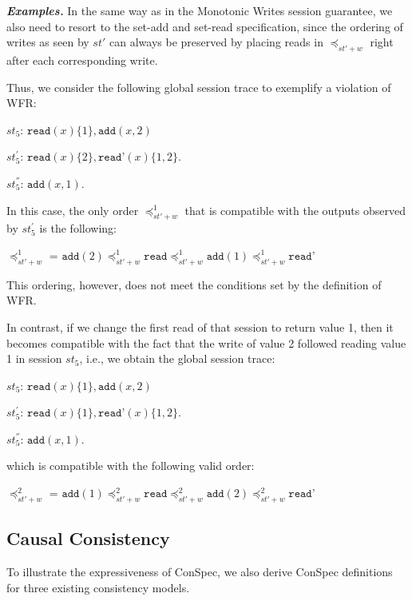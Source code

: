 \documentclass[journal,compsoc]{IEEEtran}
\begin{document}
\noindent \emph{\textbf{Examples.}}
In the same way as in the Monotonic Writes session guarantee, we also need to resort to the set-add and set-read specification, since the ordering of writes as seen by $st'$ can always be preserved by placing reads in $\preccurlyeq_{\mathit{st'}+w}$ right after each corresponding write.

Thus, we consider the following global session trace to exemplify a violation of WFR:


 $\mathit{st}_5$: $\texttt{read}(x){\{1\}},\texttt{add}(x,2)$ 

$\mathit{st}_5^{'}$: $\texttt{read}(x){\{2\}},\texttt{read'}(x){\{1,2\}}$. 

$\mathit{st}_5^{''}$: $\texttt{add}(x,1)$. 

In this case, the only order $\preccurlyeq_{\mathit{st'}+w}^1$ that is compatible with the outputs observed by $\mathit{st}_5^{'}$ is the following:

  \noindent $\preccurlyeq_{\mathit{st'}+w}^1$ = $\texttt{add}(2) \preccurlyeq_{\mathit{st'}+w}^1 \texttt{read}
  \preccurlyeq_{\mathit{st'}+w}^1  \texttt{add}(1) \preccurlyeq_{\mathit{st'}+w}^1 \texttt{read'}$

This ordering, however, does not meet the conditions set by the definition of WFR.

In contrast, if we change the first read of that session to return  value 1, then it becomes compatible with the fact that the write of value 2 followed reading value 1 in session $\mathit{st}_5$, i.e., we obtain the global session trace:

 $\mathit{st}_5$: $\texttt{read}(x){\{1\}},\texttt{add}(x,2)$ 

$\mathit{st}_5^{'}$: $\texttt{read}(x){\{1\}},\texttt{read'}(x){\{1,2\}}$. 

$\mathit{st}_5^{''}$: $\texttt{add}(x,1)$. 

which is compatible with the following valid order:

  \noindent $\preccurlyeq_{\mathit{st'}+w}^2$ = $\texttt{add}(1) \preccurlyeq_{\mathit{st'}+w}^2 \texttt{read}
  \preccurlyeq_{\mathit{st'}+w}^2  \texttt{add}(2) \preccurlyeq_{\mathit{st'}+w}^2 \texttt{read'}$



\subsection{Causal Consistency}

To illustrate the expressiveness of ConSpec, we also derive ConSpec definitions for three existing consistency models.
  
\end{document}
